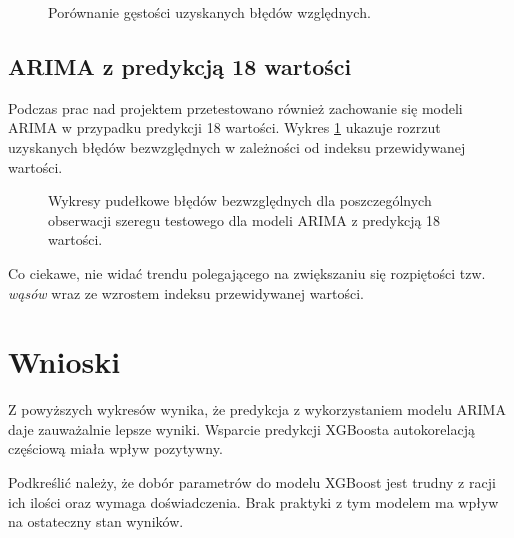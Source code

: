 \documentclass[11pt]{report}
\begin{document}
\begin{figure}[H]
    \centering
    \centering
    \def\svgwidth{10cm}
    
    \caption{Porównanie gęstości uzyskanych błędów względnych.}
\end{figure}

\subsection{ARIMA z predykcją 18 wartości}
Podczas prac nad projektem przetestowano również zachowanie się modeli ARIMA w przypadku predykcji 18 wartości.
Wykres \ref{fig:arima18} ukazuje rozrzut uzyskanych błędów bezwzględnych w zależności od indeksu przewidywanej wartości.

\begin{figure}[H]
    \centering
    \centering
    \def\svgwidth{10cm}
    
     \caption{Wykresy pudełkowe błędów bezwzględnych dla poszczególnych obserwacji szeregu testowego dla modeli ARIMA z predykcją 18 wartości.}
    \label{fig:arima18}
\end{figure}

Co ciekawe, nie widać trendu polegającego na zwiększaniu się rozpiętości tzw. \textit{wąsów} wraz ze wzrostem indeksu przewidywanej wartości.

\section{Wnioski}
Z powyższych wykresów wynika, że predykcja z wykorzystaniem modelu ARIMA daje zauważalnie lepsze wyniki.
Wsparcie predykcji XGBoosta autokorelacją częściową miała wpływ pozytywny.

Podkreślić należy, że dobór parametrów do modelu XGBoost jest trudny z racji ich ilości oraz wymaga doświadczenia.
Brak praktyki z tym modelem ma wpływ na ostateczny stan wyników.




\end{document}
